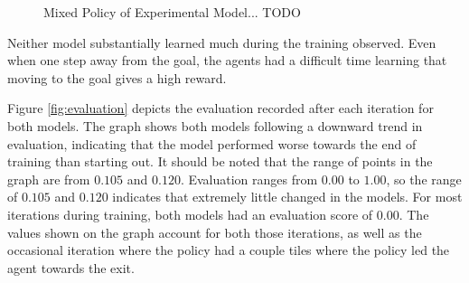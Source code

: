 \documentclass[12pt]{article}
\begin{document}
\begin{figure}[h]
	\begin{center}
		\begin{subfigure}{0.4\linewidth}
			
			\label{fig:policy_350}
		\end{subfigure}
		\hspace{0.1in}
		\begin{subfigure}{0.4\linewidth}
			
			\label{fig:policy_400}
		\end{subfigure}
	\end{center}
	\begin{center}
		\begin{subfigure}{0.4\linewidth}
			
			\label{fig:policy_450}
		\end{subfigure}
		\hspace{0.1in}
		\begin{subfigure}{0.4\linewidth}
			
			\label{fig:policy_500}
		\end{subfigure}
	\end{center}
	\caption{Mixed Policy of Experimental Model... TODO}
	\label{fig:policy}
\end{figure}


Neither model substantially learned much during the training observed.
Even when one step away from the goal, the agents had a difficult time learning that moving to the goal gives a high reward.

Figure \ref{fig:evaluation} depicts the evaluation recorded after each iteration for both models.
The graph shows both models following a downward trend in evaluation, indicating that the model performed worse towards the end of training than starting out.
It should be noted that the range of points in the graph are from $0.105$ and $0.120$.
Evaluation ranges from $0.00$ to $1.00$, so the range of $0.105$ and $0.120$ indicates that extremely little changed in the models.
For most iterations during training, both models had an evaluation score of $0.00$.
The values shown on the graph account for both those iterations, as well as the occasional iteration where the policy had a couple tiles where the policy led the agent towards the exit.
\end{document}
